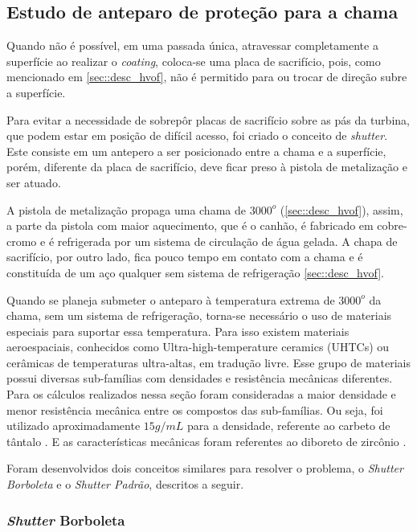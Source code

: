 \subsection{Estudo de anteparo de proteção para a chama}
Quando não é possível, em uma passada única, atraves\-sar completamente a
superfície ao realizar o \textit{coating}, coloca-se uma placa de sacrifício, pois, como
menciona\-do em \ref{sec::desc_hvof}, não é permitido para ou trocar de direção
subre a superfície.

Para evitar a necessidade de sobrepôr placas de sacrifício sobre as pás da
turbina, que podem estar em posição de difícil acesso, foi criado o conceito de
\textit{shutter}. Este consiste em um antepero a ser posicionado entre a chama e
a superfície, porém, diferente da placa de sacrifício, deve ficar preso à
pistola de metalização e ser atuado.

A pistola de metalização propaga uma chama de $3000^o$ (\ref{sec::desc_hvof}), assim,
a parte da pistola com maior aquecimento, que é o canhão, é fabricado em
cobre-cromo e é refrigerada por um sistema de circulação de água
gelada. A chapa de sacrifício, por outro lado, fica pouco tempo em contato com
a chama e é constituída de um aço qualquer sem sistema de refrigeração
\ref{sec::desc_hvof}.

Quando se planeja submeter o anteparo à temperatu\-ra extrema de $3000^o$ da
chama, sem um sistema de refrigeração, torna-se necessário o uso de materia\-is
especiais para suportar essa temperatura. Para isso existem materiais
aeroespaciais, conhecidos como Ultra-high-temperature ceramics (UHTCs) ou
cerâmi\-cas de temperaturas ultra-altas, em tradução livre. Esse grupo de
materiais possui diversas sub-famílias com densidades e resistência mecânicas
diferentes. Para os cálculos realizados nessa seção foram consideradas a maior
densidade e menor resistência mecânica entre os compostos das sub-famílias. Ou
seja, foi utilizado aproximadamente \textbf{$15 g/mL$} para a densidade, referente ao
carbeto de tântalo \citep{bansal2005ceramic}. E as características mecânicas
foram referentes ao diboreto de zircônio \citep{diborides}.

Foram desenvolvidos dois conceitos similares para resolver o problema, o \textit{Shutter
Borboleta} e o \textit{Shutter Padrão}, descritos a seguir.

\subsubsection{\textit{Shutter} Borboleta}

